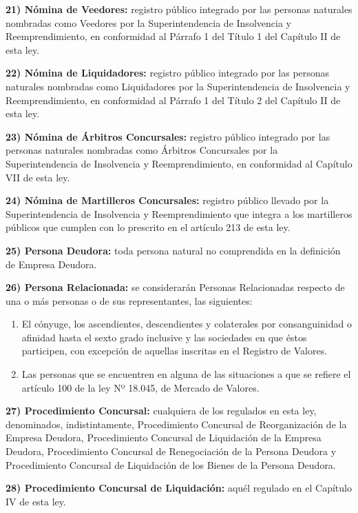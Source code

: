 \documentclass[
]{book}
\begin{document}
\textbf{21) Nómina de Veedores:} registro público integrado por las personas naturales nombradas como Veedores por la Superintendencia de Insolvencia y Reemprendimiento, en conformidad al Párrafo 1 del Título 1 del Capítulo II de esta ley.

\textbf{22) Nómina de Liquidadores:} registro público integrado por las personas naturales nombradas como Liquidadores por la Superintendencia de Insolvencia y Reemprendimiento, en conformidad al Párrafo 1 del Título 2 del Capítulo II de esta ley.

\textbf{23) Nómina de Árbitros Concursales:} registro público integrado por las personas naturales nombradas como Árbitros Concursales por la Superintendencia de Insolvencia y Reemprendimiento, en conformidad al Capítulo VII de esta ley.

\textbf{24) Nómina de Martilleros Concursales:} registro público llevado por la Superintendencia de Insolvencia y Reemprendimiento que integra a los martilleros públicos que cumplen con lo prescrito en el artículo 213 de esta ley.

\textbf{25) Persona Deudora:} toda persona natural no comprendida en la definición de Empresa Deudora.

\textbf{26) Persona Relacionada:} se considerarán Personas Relacionadas respecto de una o más personas o de sus representantes, las siguientes:

\begin{enumerate}
\def\labelenumi{\alph{enumi})}
\item
  El cónyuge, los ascendientes, descendientes y colaterales por consanguinidad o afinidad hasta el sexto grado inclusive y las sociedades en que éstos participen, con excepción de aquellas inscritas en el Registro de Valores.
\item
  Las personas que se encuentren en alguna de las situaciones a que se refiere el artículo 100 de la ley Nº 18.045, de Mercado de Valores.
\end{enumerate}

\textbf{27) Procedimiento Concursal:} cualquiera de los regulados en esta ley, denominados, indistintamente, Procedimiento Concursal de Reorganización de la Empresa Deudora, Procedimiento Concursal de Liquidación de la Empresa Deudora, Procedimiento Concursal de Renegociación de la Persona Deudora y Procedimiento Concursal de Liquidación de los Bienes de la Persona Deudora.

\textbf{28) Procedimiento Concursal de Liquidación:} aquél regulado en el Capítulo IV de esta ley.
\end{document}
